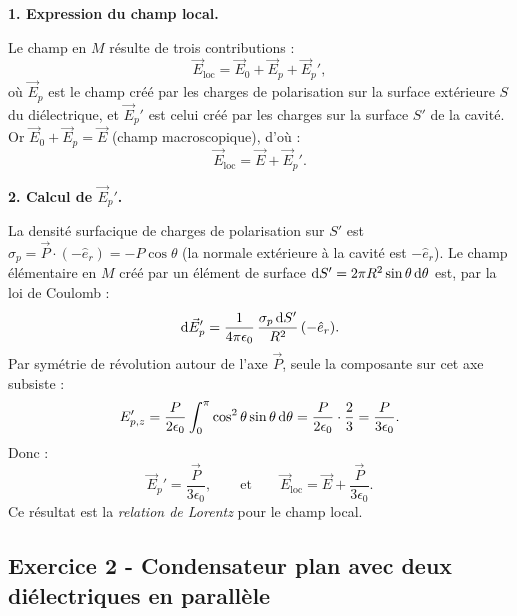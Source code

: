 \documentclass[12pt,a4paper]{article}
\begin{document}
\begin{boitecorrige}

\textbf{1. Expression du champ local.}

Le champ en $M$ résulte de trois contributions :
\[
\vec{E}_\text{loc} = \vec{E}_0 + \vec{E}_p + \vec{E}_p',
\]
où $\vec{E}_p$ est le champ créé par les charges de polarisation sur la surface extérieure $S$ du diélectrique, et $\vec{E}_p'$ est celui créé par les charges sur la surface $S'$ de la cavité. Or $\vec{E}_0 + \vec{E}_p = \vec{E}$ (champ macroscopique), d'où :
\[
\vec{E}_\text{loc} = \vec{E} + \vec{E}_p'.
\]

\textbf{2. Calcul de $\vec{E}_p'$.}

La densité surfacique de charges de polarisation sur $S'$ est $\sigma_p = \vec{P}\cdot(-\hat{e}_r) = -P\cos\theta$ (la normale extérieure à la cavité est $-\hat{e}_r$). Le champ élémentaire en $M$ créé par un élément de surface $\mathrm{d} S' = 2\pi R^2\sin\theta\,\mathrm{d}\theta$ est, par la loi de Coulomb :
\[
\mathrm{d}\vec{E}_p' = \frac{1}{4\pi\epsilon_0}\,\frac{\sigma_p\,\mathrm{d} S'}{R^2}\,(-\hat{e}_r).
\]
Par symétrie de révolution autour de l'axe $\vec{P}$, seule la composante sur cet axe subsiste :
\[
E_{p,z}' = \frac{P}{2\epsilon_0}\int_0^{\pi}\cos^2\theta\sin\theta\,\mathrm{d}\theta
= \frac{P}{2\epsilon_0}\cdot\frac{2}{3} = \frac{P}{3\epsilon_0}.
\]
Donc :
\[
\vec{E}_p' = \frac{\vec{P}}{3\epsilon_0},
\qquad\text{et}\qquad
\boxed{\vec{E}_\text{loc} = \vec{E} + \frac{\vec{P}}{3\epsilon_0}.}
\]
Ce résultat est la \emph{relation de Lorentz} pour le champ local.
\end{boitecorrige}

\subsection*{Exercice 2 - Condensateur plan avec deux diélectriques en parallèle \niveau{\moyen}}
\end{document}
